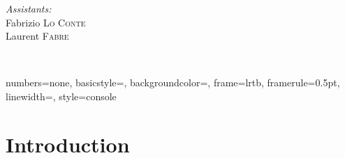 \begin{titlepage}
\begin{center}
\begin{minipage}{0.4\textwidth}
\begin{flushright}
        \emph{Assistants:} \\
        Fabrizio \textsc{Lo Conte}\\
        Laurent \textsc{Fabre}\\[0.5cm]
      \end{flushright}
    \end{minipage} \\[2cm]
     
    \vfill
     
    {\large \thedate}
     
  \end{center}

\end{titlepage}

\newpage{}

\fancyfoot{}
\lhead{}
\cfoot{\thepage}        %
\rfoot{\thedate} 


\setcounter{secnumdepth}{5}

\tableofcontents{}

\newpage

\lstset{language=C}

{
  numbers=none,
  basicstyle=\ttfamily\footnotesize,
  backgroundcolor=\color{grey97},
  frame=lrtb,
  framerule=0.5pt,
  linewidth=\textwidth,
}
{
  style=console
}

\lstset{
  style=console
}



\section*{Introduction}

